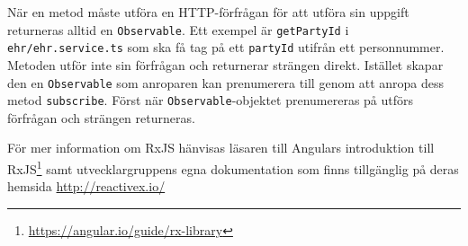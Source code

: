 \documentclass[techdoc/techdoc.tex]{subfiles}
\begin{document}
När en metod måste utföra en HTTP-förfrågan för att utföra sin uppgift
returneras alltid en \texttt{Observable}. Ett exempel är \texttt{getPartyId} i
\texttt{ehr/ehr.service.ts} som ska få tag på ett \texttt{partyId} utifrån ett
personnummer. Metoden utför inte sin förfrågan och returnerar strängen direkt.
Istället skapar den en \texttt{Observable} som anroparen kan prenumerera till
genom att anropa dess metod \texttt{subscribe}. Först när
\texttt{Observable}-objektet prenumereras på utförs förfrågan och strängen
returneras.

För mer information om RxJS hänvisas läsaren till Angulars introduktion till
RxJS\footnote{\url{https://angular.io/guide/rx-library}}
samt utvecklargruppens egna dokumentation som finns tillgänglig på deras
hemsida \url{http://reactivex.io/}
\end{document}
